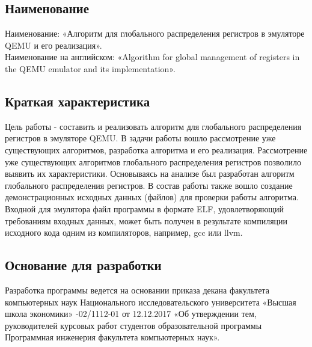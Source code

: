 \subsection{Наименование}
Наименование: «Алгоритм для глобального распределения регистров в эмуляторе QEMU и его реализация». \\
Наименование на английском: «Algorithm for global management of registers in the QEMU emulator and its implementation». \\

\subsection{Краткая характеристика}
    Цель работы - составить и реализовать алгоритм для глобального распределения регистров в эмуляторе QEMU.
    В задачи работы вошло рассмотрение уже существующих алгоритмов, разработка алгоритма и его реализация.
    Рассмотрение уже существующих алгоритмов глобального распределения регистров позволило выявить их характеристики. Основываясь на анализе был разработан алгоритм глобального распределения регистров.
    В состав работы также вошло создание демонстрационных исходных данных (файлов) для проверки работы алгоритма. Входной для эмулятора файл программы в формате ELF, удовлетворяющий требованиям входных данных, может быть получен в результате компиляции исходного кода одним из компиляторов, например, gcc или llvm.

\subsection{Основание для разработки}
Разработка программы ведется на основании приказа декана факультета компьютерных наук
Национального исследовательского университета «Высшая школа экономики» 
-02/1112-01 от 12.12.2017
«Об  утверждении  тем,  руководителей  курсовых  работ  студентов
образовательной  программы  Программная  инженерия 
факультета 
компьютерных наук».